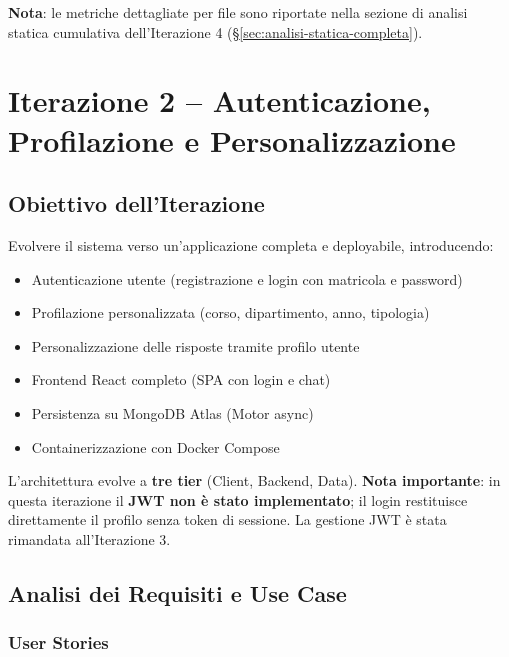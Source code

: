 \documentclass[a4paper,12pt]{report}
\begin{document}
\textbf{Nota}: le metriche dettagliate per file sono riportate nella sezione di analisi statica cumulativa dell'Iterazione 4 (§\ref{sec:analisi-statica-completa}).


\chapter{Iterazione 2 -- Autenticazione, Profilazione e Personalizzazione}

\section{Obiettivo dell'Iterazione}

Evolvere il sistema verso un'applicazione completa e deployabile, introducendo:
\begin{itemize}
    \item Autenticazione utente (registrazione e login con matricola e password)
    \item Profilazione personalizzata (corso, dipartimento, anno, tipologia)
    \item Personalizzazione delle risposte tramite profilo utente
    \item Frontend React completo (SPA con login e chat)
    \item Persistenza su MongoDB Atlas (Motor async)
    \item Containerizzazione con Docker Compose
\end{itemize}

L'architettura evolve a \textbf{tre tier} (Client, Backend, Data). \textbf{Nota importante}: in questa iterazione il \textbf{JWT non è stato implementato}; il login restituisce direttamente il profilo senza token di sessione. La gestione JWT è stata rimandata all'Iterazione 3.

\section{Analisi dei Requisiti e Use Case}

\subsection{User Stories}
\end{document}

